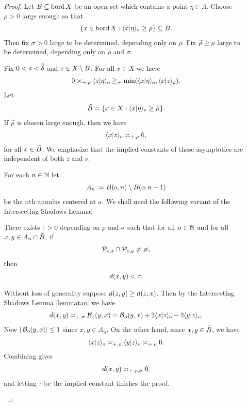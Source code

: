 \begin{proof}
Let $B\subseteq\operatorname{bord} X$ be an open set which contains a point $\eta\in\Lambda$. Choose $\rho > 0$ large enough so that
\[
\{x\in\operatorname{bord} X:\langle x|\eta\rangle_o\geq \rho\} \subseteq B.
\]
Then fix $\sigma > 0$ large to be determined, depending only on $\rho$. Fix $\widetilde\rho\geq\rho$ large to be determined, depending only on $\rho$ and $\sigma$.

Fix $0 < s < \widetilde\delta$ and $z\in X\setminus B$. For all $x\in X$ we have
\[
0 \asymp_{+,\rho} \langle z|\eta\rangle_o \gtrsim_+ \min(\langle x|\eta\rangle_o,\langle x|z\rangle_o).
\]
Let
\[
\widetilde B = \{x\in X:\langle x|\eta\rangle_o \geq \widetilde\rho\hspace{.01 in}\}.
\]
If $\widetilde\rho$ is chosen large enough, then we have
\begin{equation}\label{xz0}
\langle x|z\rangle_o \asymp_{+,\rho} 0,
\end{equation}
for all $x\in \widetilde B$. We emphasize that the implied constants of these asymptotics are independent of both $z$ and $s$.

For each $n\in\N$ let 
\[
A_n := B(o,n)\setminus B(o,n - 1)
\] 
be the $n$th annulus centered at $o$. We shall need the following variant of the Intersecting Shadows Lemma:

\begin{claim}
\label{claimtau}
There exists $\tau > 0$ depending on $\rho$ and $\sigma$ such that for all $n\in\N$ and for all $x,y\in A_n\cap \widetilde B$, if
\[
\PP_{z,x}\cap \PP_{z,y}\neq\emptyset,
\]
then 
\[
d(x,y) < \tau.
\] 
\end{claim}
\begin{subproof}
Without loss of generality suppose $d(z,y)\geq d(z,x)$. Then by the Intersecting Shadows Lemma \ref{lemmatau} we have
\[
d(x,y) \asymp_{+,\sigma} \operatorname{\mathcal B}_z(y,x)
= \operatorname{\mathcal B}_o(y,x) + 2\langle x|z\rangle_o - 2\langle y|z\rangle_o.
\]
Now $|\operatorname{\mathcal B}_o(y,x)| \leq 1$ since $x,y\in A_n$. On the other hand, since $x,y\in\widetilde B$, we have
\[
\langle x|z\rangle_o \asymp_{+,\rho} \langle y|z\rangle_o \asymp_{+,\rho} 0.
\]
Combining gives
\[
d(x,y) \asymp_{+,\rho,\sigma} 0,
\]
and letting $\tau$ be the implied constant finishes the proof.
\end{subproof}


\end{proof}
